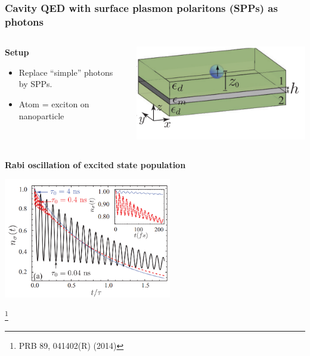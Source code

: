 \documentclass[t]{beamer}
\newcommand\blfootnote[1]{%
\begingroup
\renewcommand\thefootnote{}\footnote{#1}%
\addtocounter{footnote}{-1}%
\endgroup
}
\begin{document}
\begin{frame}
\frametitle{Cavity QED with surface
plasmon polaritons (SPPs) as photons}

\begin{columns}[T]
    \begin{column}{0.7\textwidth}
        \textbf{Setup}
        \begin{itemize}
            \item Replace ``simple'' photons by SPPs.
            \item Atom = exciton on nanoparticle
        \end{itemize}
    \end{column}
    \begin{column}{0.3\textwidth}
        \includegraphics[width=\textwidth]{figs/emitter-in-sandwich.PNG}
    \end{column}
\end{columns}

\textbf{Rabi oscillation of excited state population} 
\begin{center}
    \includegraphics[width=0.55\textwidth]{figs/emitter-plasmon.PNG}
\end{center}

\vspace{-0.5cm}
\blfootnote{PRB 89, 041402(R) (2014)}

\end{frame}
\end{document}
